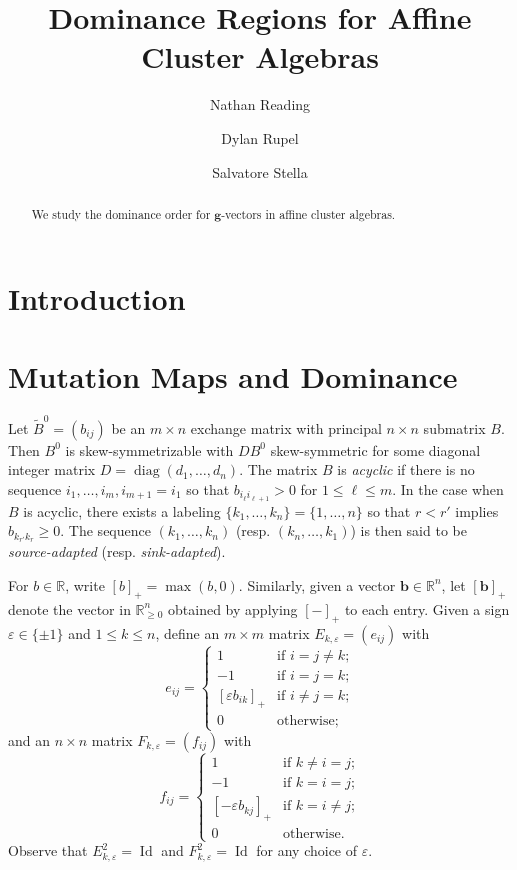\documentclass{amsart}
\title{Dominance Regions for Affine Cluster Algebras}
\author{Nathan Reading}
\author{Dylan Rupel}
\author{Salvatore Stella}
\numberwithin{theorem}{section}
\newcommand{\bfb}{\boldsymbol{b}}
\newcommand{\bfg}{\boldsymbol{g}}
\newcommand{\RR}{\mathbb{R}}
\newcommand{\diag}{\operatorname{diag}}
\newcommand{\Id}{\operatorname{Id}}
\begin{document}
  \begin{abstract}
    We study the dominance order for $\bfg$-vectors in affine cluster algebras.
  \end{abstract}
  \maketitle

  \section{Introduction}


  \section{Mutation Maps and Dominance}
  Let $\tilde B^0=(b_{ij})$ be an $m\times n$ exchange matrix with principal $n\times n$ submatrix $B$.
  Then $B^0$ is skew-symmetrizable with $DB^0$ skew-symmetric for some diagonal integer matrix $D=\diag(d_1,\ldots,d_n)$.
  The matrix $B$ is \emph{acyclic} if there is no sequence $i_1,\ldots,i_m,i_{m+1}=i_1$ so that $b_{i_\ell i_{\ell+1}}>0$ for $1\le\ell\le m$.
  In the case when $B$ is acyclic, there exists a labeling $\{k_1,\ldots,k_n\}=\{1,\ldots,n\}$ so that $r<r'$ implies $b_{k_{r'} k_r}\ge 0$.
  The sequence $(k_1,\ldots,k_n)$ (resp. $(k_n,\ldots,k_1)$) is then said to be \emph{source-adapted} (resp. \emph{sink-adapted}).

  For $b\in\RR$, write $[b]_+=\max(b,0)$.
  Similarly, given a vector $\bfb\in\RR^n$, let $[\bfb]_+$ denote the vector in $\RR_{\ge0}^n$ obtained by applying $[-]_+$ to each entry.
  Given a sign $\varepsilon\in\{\pm1\}$ and $1\le k\le n$, define an $m\times m$ matrix $E_{k,\varepsilon}=(e_{ij})$ with
  \begin{equation}
    \label{eq:left mutation matrix}
    e_{ij}=\begin{cases} 1 & \text{if $i=j\ne k$;}\\ -1 & \text{if $i=j=k$;}\\ [\varepsilon b_{ik}]_+ & \text{if $i\ne j=k$;}\\ 0 & \text{otherwise;} \end{cases}
  \end{equation}
  and an $n\times n$ matrix $F_{k,\varepsilon}=(f_{ij})$ with
  \begin{equation}
    \label{eq:right mutation matrix}
    f_{ij}=\begin{cases} 1 & \text{if $k\ne i=j$;}\\ -1 & \text{if $k=i=j$;}\\ [-\varepsilon b_{kj}]_+ & \text{if $k=i\ne j$;}\\ 0 & \text{otherwise.} \end{cases}
  \end{equation}
  Observe that $E^2_{k,\varepsilon}=\Id$ and $F^2_{k,\varepsilon}=\Id$ for any choice of $\varepsilon$.
\end{document}
